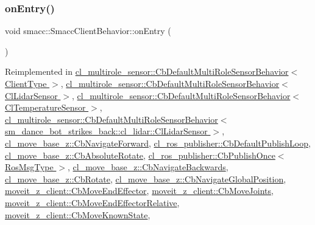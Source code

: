 \subsubsection{\texorpdfstring{on\+Entry()}{onEntry()}}
{\footnotesize\ttfamily void smacc\+::\+Smacc\+Client\+Behavior\+::on\+Entry (\begin{DoxyParamCaption}{ }\end{DoxyParamCaption})\hspace{0.3cm}{\ttfamily [virtual]}}



Reimplemented in \hyperlink{classcl__multirole__sensor_1_1CbDefaultMultiRoleSensorBehavior_a5ac29f93cc91e23715f51ade94467cae}{cl\+\_\+multirole\+\_\+sensor\+::\+Cb\+Default\+Multi\+Role\+Sensor\+Behavior$<$ Client\+Type $>$}, \hyperlink{classcl__multirole__sensor_1_1CbDefaultMultiRoleSensorBehavior_a5ac29f93cc91e23715f51ade94467cae}{cl\+\_\+multirole\+\_\+sensor\+::\+Cb\+Default\+Multi\+Role\+Sensor\+Behavior$<$ Cl\+Lidar\+Sensor $>$}, \hyperlink{classcl__multirole__sensor_1_1CbDefaultMultiRoleSensorBehavior_a5ac29f93cc91e23715f51ade94467cae}{cl\+\_\+multirole\+\_\+sensor\+::\+Cb\+Default\+Multi\+Role\+Sensor\+Behavior$<$ Cl\+Temperature\+Sensor $>$}, \hyperlink{classcl__multirole__sensor_1_1CbDefaultMultiRoleSensorBehavior_a5ac29f93cc91e23715f51ade94467cae}{cl\+\_\+multirole\+\_\+sensor\+::\+Cb\+Default\+Multi\+Role\+Sensor\+Behavior$<$ sm\+\_\+dance\+\_\+bot\+\_\+strikes\+\_\+back\+::cl\+\_\+lidar\+::\+Cl\+Lidar\+Sensor $>$}, \hyperlink{classcl__move__base__z_1_1CbNavigateForward_af9a2e49071de287922c3f5963a079b95}{cl\+\_\+move\+\_\+base\+\_\+z\+::\+Cb\+Navigate\+Forward}, \hyperlink{classcl__ros__publisher_1_1CbDefaultPublishLoop_a6e6cfb477cbefc510ca7b55a061545e4}{cl\+\_\+ros\+\_\+publisher\+::\+Cb\+Default\+Publish\+Loop}, \hyperlink{classcl__move__base__z_1_1CbAbsoluteRotate_a10418ea360809fa649d295716b152b2b}{cl\+\_\+move\+\_\+base\+\_\+z\+::\+Cb\+Absolute\+Rotate}, \hyperlink{classcl__ros__publisher_1_1CbPublishOnce_afaed71bc2694ec1837278d5f931a76e1}{cl\+\_\+ros\+\_\+publisher\+::\+Cb\+Publish\+Once$<$ Ros\+Msg\+Type $>$}, \hyperlink{classcl__move__base__z_1_1CbNavigateBackwards_a545a5282f0ef6b0080b46002d6037567}{cl\+\_\+move\+\_\+base\+\_\+z\+::\+Cb\+Navigate\+Backwards}, \hyperlink{classcl__move__base__z_1_1CbRotate_a316ee51ecfd3f10fd1edae0d7d3b26c0}{cl\+\_\+move\+\_\+base\+\_\+z\+::\+Cb\+Rotate}, \hyperlink{classcl__move__base__z_1_1CbNavigateGlobalPosition_a66d8b0555ef2945bc108dcd5171be292}{cl\+\_\+move\+\_\+base\+\_\+z\+::\+Cb\+Navigate\+Global\+Position}, \hyperlink{classmoveit__z__client_1_1CbMoveEndEffector_a5306018b432c9d8f8a31823f6b317d84}{moveit\+\_\+z\+\_\+client\+::\+Cb\+Move\+End\+Effector}, \hyperlink{classmoveit__z__client_1_1CbMoveJoints_a512e97e94ab05ee12837433e5d921095}{moveit\+\_\+z\+\_\+client\+::\+Cb\+Move\+Joints}, \hyperlink{classmoveit__z__client_1_1CbMoveEndEffectorRelative_ae425a51d23933a13a87df9cd26f0fc99}{moveit\+\_\+z\+\_\+client\+::\+Cb\+Move\+End\+Effector\+Relative}, \hyperlink{classmoveit__z__client_1_1CbMoveKnownState_a449644896e100c8233d58cb3a57bcff4}{moveit\+\_\+z\+\_\+client\+::\+Cb\+Move\+Known\+State}, 
